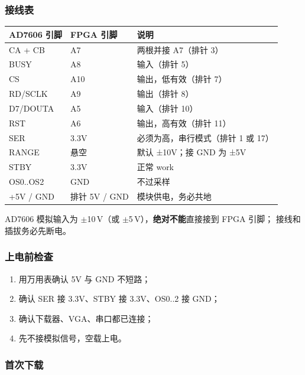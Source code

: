 \subsubsection{接线表}

\begin{center}
\small
\begin{tabular}{lll}
\toprule
AD7606 引脚 & FPGA 引脚 & 说明\\
\midrule
CA + CB & A7 & 两根并接 A7（排针 3）\\
BUSY & A8 & 输入（排针 5）\\
CS & A10 & 输出，低有效（排针 7）\\
RD/SCLK & A9 & 输出（排针 8）\\
D7/DOUTA & A5 & 输入（排针 10）\\
RST & A6 & 输出，高有效（排针 11）\\
SER & 3.3V & 必须为高，串行模式（排针 1 或 17）\\
RANGE & 悬空 & 默认 ±10V；接 GND 为 ±5V\\
STBY & 3.3V & 正常 work\\
OS0..OS2 & GND & 不过采样\\
+5V / GND & 排针 5V / GND & 模块供电，务必共地\\
\bottomrule
\end{tabular}
\end{center}

\begin{warnbox}
AD7606 模拟输入为 $\pm$10\,V（或 $\pm$5\,V），\textbf{绝对不能}直接接到 FPGA 引脚；
接线和插拔务必先断电。
\end{warnbox}

\subsubsection{上电前检查}

\begin{enumerate}[leftmargin=2em,itemsep=2pt]
  \item 用万用表确认 5V 与 GND 不短路；
  \item 确认 SER 接 3.3V、STBY 接 3.3V、OS0..2 接 GND；
  \item 确认下载器、VGA、串口都已连接；
  \item 先不接模拟信号，空载上电。
\end{enumerate}

\subsubsection{首次下载}

